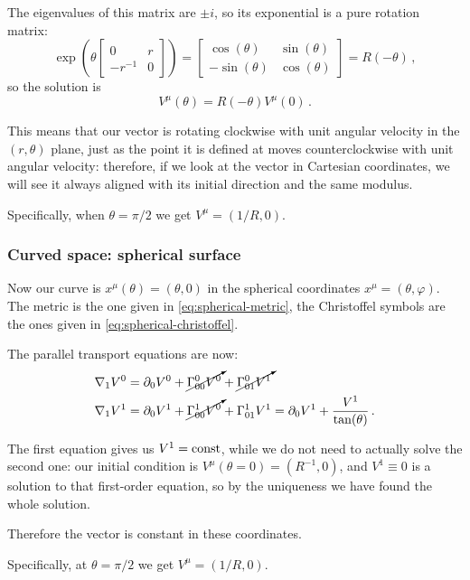 \documentclass[main.tex]{subfiles}
\begin{document}
The eigenvalues of this matrix are \(\pm i\), so its exponential is a pure rotation matrix: 
%
\begin{equation}
  \exp(\theta \left[\begin{array}{cc}
  0 & r \\ 
  -r^{-1} & 0
  \end{array}\right]) =
  \left[\begin{array}{cc}
  \cos(\theta )  & \sin(\theta )  \\ 
  -\sin(\theta )  & \cos(\theta ) 
  \end{array}\right] = R(-\theta )
\,,
\end{equation}
%
so the solution is 
%
\begin{equation}
  V^{\mu }(\theta ) = R(-\theta )V^{\mu }(0)
\,.
\end{equation}

This means that our vector is rotating clockwise with unit angular velocity in the \((r, \theta )\) plane, just as the point it is defined at moves counterclockwise with unit angular velocity: therefore, if we look at the vector in Cartesian coordinates, we will see it always aligned with its initial direction and the same modulus.

Specifically, when \(\theta = \pi /2\) we get \(V^{\mu }=(1/R, 0)\).

\subsubsection{Curved space: spherical surface}

Now our curve is \(x^{\mu } (\theta ) = (\theta , 0)\) in the spherical coordinates \(x^{\mu } = (\theta, \varphi )\). The metric is the one given in \eqref{eq:spherical-metric}, the Christoffel symbols are the ones given in \eqref{eq:spherical-christoffel}.

The parallel transport equations are now: 
%
\begin{subequations}
\begin{align}
  \nabla_{1}V^{0} &= \partial_0 V^{0} + \cancelto{}{\Gamma^{0}_{00}V^{0}} + \cancelto{}{\Gamma^{0}_{01}V^{1} }  \\
  \nabla_{1}V^{1} &= \partial_0 V^{1} + \cancelto{}{\Gamma^{1}_{00}V^{0}} + \Gamma^{1}_{01}V^{1}
  = \partial_0 V^{1} + \frac{V^{1}}{\tan(\theta )}
\,.
\end{align}
\end{subequations}

The first equation gives us \(V^{1} = \text{const}\), while we do not need to actually solve the second one: our initial condition is \(V^{\mu}(\theta = 0) = (R^{-1}, 0)\), and \(V^{1} \equiv 0\) is a solution to that first-order equation, so by the uniqueness we have found the whole solution.

Therefore the vector is constant in these coordinates.

Specifically, at \(\theta = \pi /2\) we get \(V^{\mu } = (1/R, 0)\).
\end{document}
